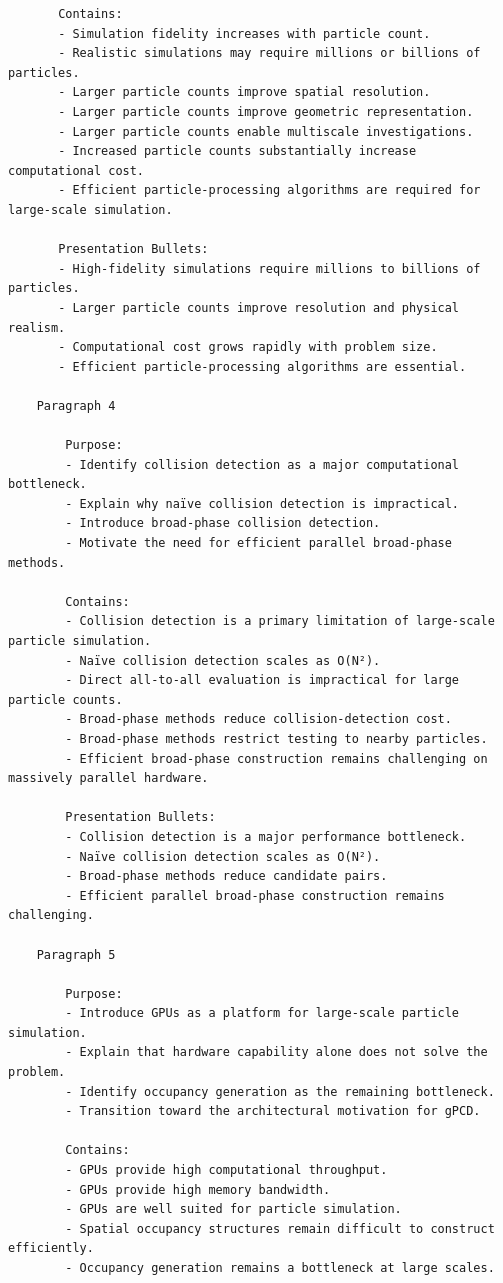 \begin{verbatim}
	   Contains:
	   - Simulation fidelity increases with particle count.
	   - Realistic simulations may require millions or billions of particles.
	   - Larger particle counts improve spatial resolution.
	   - Larger particle counts improve geometric representation.
	   - Larger particle counts enable multiscale investigations.
	   - Increased particle counts substantially increase computational cost.
	   - Efficient particle-processing algorithms are required for large-scale simulation.

	   Presentation Bullets:
	   - High-fidelity simulations require millions to billions of particles.
	   - Larger particle counts improve resolution and physical realism.
	   - Computational cost grows rapidly with problem size.
	   - Efficient particle-processing algorithms are essential.
   
	Paragraph 4

		Purpose:
		- Identify collision detection as a major computational bottleneck.
		- Explain why naïve collision detection is impractical.
		- Introduce broad-phase collision detection.
		- Motivate the need for efficient parallel broad-phase methods.

		Contains:
		- Collision detection is a primary limitation of large-scale particle simulation.
		- Naïve collision detection scales as O(N²).
		- Direct all-to-all evaluation is impractical for large particle counts.
		- Broad-phase methods reduce collision-detection cost.
		- Broad-phase methods restrict testing to nearby particles.
		- Efficient broad-phase construction remains challenging on massively parallel hardware.

		Presentation Bullets:
		- Collision detection is a major performance bottleneck.
		- Naïve collision detection scales as O(N²).
		- Broad-phase methods reduce candidate pairs.
		- Efficient parallel broad-phase construction remains challenging.
	   
	Paragraph 5

		Purpose:
		- Introduce GPUs as a platform for large-scale particle simulation.
		- Explain that hardware capability alone does not solve the problem.
		- Identify occupancy generation as the remaining bottleneck.
		- Transition toward the architectural motivation for gPCD.

		Contains:
		- GPUs provide high computational throughput.
		- GPUs provide high memory bandwidth.
		- GPUs are well suited for particle simulation.
		- Spatial occupancy structures remain difficult to construct efficiently.
		- Occupancy generation remains a bottleneck at large scales.


\end{verbatim}
